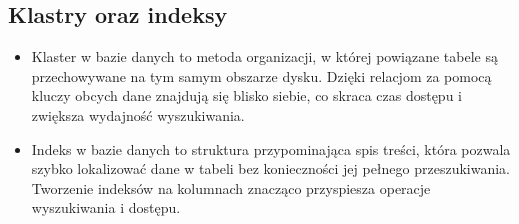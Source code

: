 \documentclass[a4paper,11pt,openany,english]{sphinxmanual}
\begin{document}
\subsection{Klastry oraz indeksy}
\label{\detokenize{rozdzial2/index:klastry-oraz-indeksy}}\begin{itemize}
\item {} 
\sphinxAtStartPar
Klaster w bazie danych to metoda organizacji, w której powiązane tabele są przechowywane na tym samym obszarze dysku. Dzięki relacjom za pomocą kluczy obcych dane znajdują się blisko siebie, co skraca czas dostępu i zwiększa wydajność wyszukiwania.

\item {} 
\sphinxAtStartPar
Indeks w bazie danych to struktura przypominająca spis treści, która pozwala szybko lokalizować dane w tabeli bez konieczności jej pełnego przeszukiwania. Tworzenie indeksów na kolumnach znacząco przyspiesza operacje wyszukiwania i dostępu.

\end{itemize}
\end{document}
